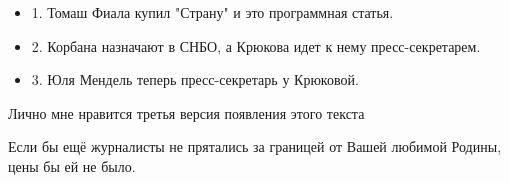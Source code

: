 \begin{itemize}
\begin{itemize}
  \item 1. Томаш Фиала купил "Страну" и это программная статья.
  \item 2. Корбана назначают в СНБО, а Крюкова идет к нему пресс-секретарем.
  \item 3. Юля Мендель теперь пресс-секретарь у Крюковой.
\end{itemize}

Лично мне нравится третья версия появления этого текста \Smiley[1.0][yellow]

 
Если бы ещё журналисты не прятались за границей от Вашей любимой Родины, цены бы ей не было.

\end{itemize}

